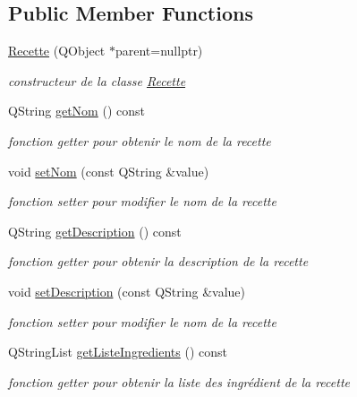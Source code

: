 \subsection*{Public Member Functions}
\begin{DoxyCompactItemize}
\item 
\hyperlink{classRecette_a23c2060e8d97d05f5f9b9178b7efdf65}{Recette} (Q\+Object $\ast$parent=nullptr)
\begin{DoxyCompactList}\small\item\em constructeur de la classe \hyperlink{classRecette}{Recette} \end{DoxyCompactList}\item 
Q\+String \hyperlink{classRecette_afab5d7deab9130137037872a7a42ef3c}{get\+Nom} () const
\begin{DoxyCompactList}\small\item\em fonction getter pour obtenir le nom de la recette \end{DoxyCompactList}\item 
void \hyperlink{classRecette_a8c5387d06e11ecfaf827142146ca0b08}{set\+Nom} (const Q\+String \&value)
\begin{DoxyCompactList}\small\item\em fonction setter pour modifier le nom de la recette \end{DoxyCompactList}\item 
Q\+String \hyperlink{classRecette_a7f3746b691f39d1b468b29819ad3c265}{get\+Description} () const
\begin{DoxyCompactList}\small\item\em fonction getter pour obtenir la description de la recette \end{DoxyCompactList}\item 
void \hyperlink{classRecette_ad8e3af91743c2509d82983f5da803186}{set\+Description} (const Q\+String \&value)
\begin{DoxyCompactList}\small\item\em fonction setter pour modifier le nom de la recette \end{DoxyCompactList}\item 
Q\+String\+List \hyperlink{classRecette_a3ca29579050212dea9da71e9c1f05119}{get\+Liste\+Ingredients} () const
\begin{DoxyCompactList}\small\item\em fonction getter pour obtenir la liste des ingrédient de la recette \end{DoxyCompactList}\item 

\end{DoxyCompactItemize}
